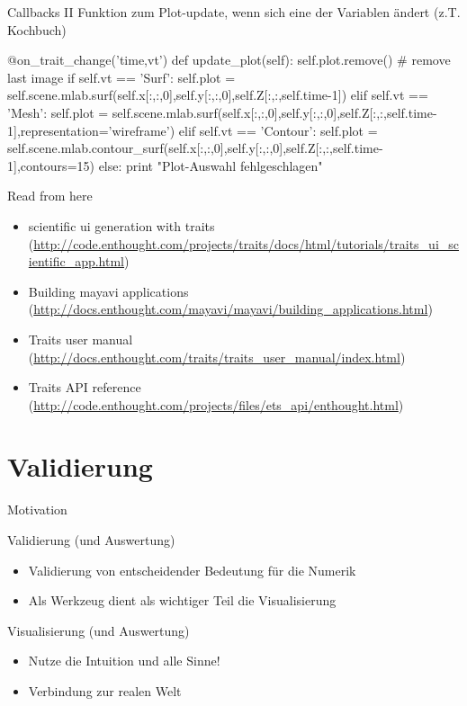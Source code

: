 \documentclass[hyperref={xetex}]{beamer}
\begin{document}
\begin{frame}[fragile]{Callbacks II}
Funktion zum Plot-update, wenn sich eine der Variablen ändert (z.T. Kochbuch)
\begin{pyin}
    @on_trait_change('time,vt')
    def update_plot(self):
        self.plot.remove() # remove last image
        if self.vt == 'Surf':
            self.plot = self.scene.mlab.surf(self.x[:,:,0],self.y[:,:,0],self.Z[:,:,self.time-1])
        elif self.vt == 'Mesh':
            self.plot = self.scene.mlab.surf(self.x[:,:,0],self.y[:,:,0],self.Z[:,:,self.time-1],representation='wireframe')
        elif self.vt == 'Contour':
            self.plot = self.scene.mlab.contour_surf(self.x[:,:,0],self.y[:,:,0],self.Z[:,:,self.time-1],contours=15)
        else:
            print "Plot-Auswahl fehlgeschlagen"  
\end{pyin}
\end{frame}

\begin{frame}[fragile]{Read from here}
  \begin{itemize}
    \item scientific ui generation with traits (\url{http://code.enthought.com/projects/traits/docs/html/tutorials/traits_ui_scientific_app.html})\\
    \item Building mayavi applications (\url{http://docs.enthought.com/mayavi/mayavi/building_applications.html})\\
    \item Traits user manual (\url{http://docs.enthought.com/traits/traits_user_manual/index.html})\\
    \item Traits API reference  (\url{http://code.enthought.com/projects/files/ets_api/enthought.html})
  \end{itemize}

\end{frame}


\section{Validierung}

\begin{frame}{Motivation}
  \begin{block}{Validierung (und Auswertung)}
\begin{itemize}
  \item Validierung von entscheidender Bedeutung für die Numerik
  \item Als Werkzeug dient als wichtiger Teil die Visualisierung 
\end{itemize}
  \end{block}
  \begin{block}{Visualisierung (und Auswertung)}
    \begin{itemize}
  \item Nutze die Intuition und alle Sinne!
      \item Verbindung zur realen Welt
    \end{itemize}
  \end{block}
\end{frame}
\end{document}
